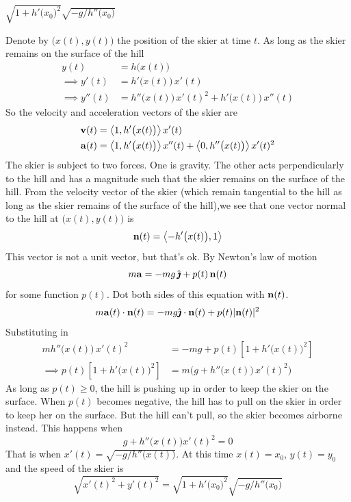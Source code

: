 \begin{answer}
$\sqrt{1+h'\big(x_0\big)^2}\sqrt{-g/h''\big(x_0\big)}$
\end{answer}

\begin{solution}
Denote by $\big(x(t),y(t)\big)$ the position of the skier at time $t$. As long as the skier remains on the surface of the hill
\begin{align*}
y(t)&=h\big(x(t)\big)   \\
\implies y'(t)&=h'\big(x(t)\big)\,x'(t)  \\
\implies y''(t)&=h''\big(x(t)\big)\, x'(t)^2+h'\big(x(t)\big)\,x''(t)
\end{align*}
So the velocity and acceleration vectors of the skier are
\begin{align*}
\mathbf{v}(t)&=\left< 1,h'\big(x(t)\big)\right> x'(t) \\
\mathbf{a}(t)&=\left< 1,h'\big(x(t)\big)\right> x''(t)
+\left< 0,h''\big(x(t)\big)\right> x'(t)^2
\end{align*}
The skier is subject to two forces. One is gravity. The other
acts perpendicularly to the hill and has a magnitude such that the skier
remains on the surface of the hill. From the velocity vector of the
skier (which remain tangential to the hill as long as the skier
remains of the surface of the hill),we see that one vector normal to
the hill at $\big(x(t),y(t)\big)$ is 
$$
\mathbf{n}(t)=\left<-h'\big(x(t)\big),1\right>
$$
This vector is not a unit  vector, but that's ok. By Newton's law
of motion
\begin{equation*}
m\mathbf{a}=-mg\,\hat{\pmb{\jmath}}+p(t)\,\mathbf{n}(t)
\end{equation*}
for some function $p(t)$.
Dot both sides of this equation with $\mathbf{n}(t)$.
\begin{equation*}
m\mathbf{a}(t)\cdot\mathbf{n}(t)=-mg\hat{\pmb{\jmath}}\cdot\mathbf{n}(t)+p(t)|\mathbf{n}(t)|^2
\end{equation*}
Substituting in
\begin{align*}
mh''\big(x(t)\big)\,x'(t)^2&=-mg+p(t)\left[1+h'\big(x(t)\big)^2\right] \\
\implies p(t)\left[1+h'\big(x(t)\big)^2\right]
&=m\Big(g+h''\big(x(t)\big)\,x'(t)^2\Big)
\end{align*}
As long as $p(t)\ge 0$, the hill is pushing up in order to keep the skier
on the surface. When $p(t)$ becomes negative, the hill has to pull on the
skier in order to keep her on the surface. But the hill can't pull, 
so the skier becomes airborne instead. This happens when
\begin{equation*}
g+h''\big(x(t)\big)x'(t)^2=0
\end{equation*}
That is when $x'(t)=\sqrt{-g/h''\big(x(t)\big)}$. At this time $x(t)=x_0$, $y(t)=y_0$ and the speed of the skier is 
\begin{equation*}
\sqrt{x'(t)^2+y'(t)^2}
=\sqrt{1+h'\big(x_0\big)^2}\sqrt{-g/h''\big(x_0\big)}
\end{equation*}
\end{solution}


